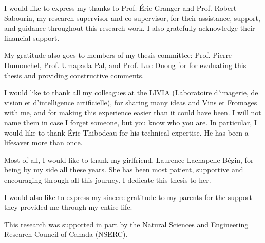I would like to express my thanks to Prof. Éric Granger and Prof. Robert Sabourin, my research supervisor and co-supervisor, for their assistance, support, and guidance throughout this research work.
I also gratefully acknowledge their financial support.

My gratitude also goes to members of my thesis committee: Prof. Pierre Dumouchel, Prof. Umapada Pal, and Prof. Luc Duong for for evaluating this thesis and providing constructive comments.

I would like to thank all my colleagues at the LIVIA (Laboratoire d'imagerie, de vision et d'intelligence artificielle), for sharing many ideas and Vins et Fromages with me, and for making this experience easier than it could have been.
I will not name them in case I forget someone, but you know who you are.
In particular, I would like to thank \'{E}ric Thibodeau for his technical expertise.
He has been a lifesaver more than once.

Most of all, I would like to thank my girlfriend, Laurence Lachapelle-B\'{e}gin, for being by my side all these years.
She has been most patient, supportive and encouraging through all this journey.
I dedicate this thesis to her.

I would also like to express my sincere gratitude to my parents for the support they provided me through my entire life.

This research was supported in part by the Natural Sciences and Engineering Research Council of Canada (NSERC).
